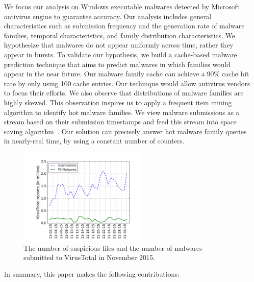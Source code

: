 We focus our analysis on Windows executable malwares detected by Microsoft
antivirus engine to guarantee accuracy. 
Our analysis includes general characteristics such as submission frequency and the generation rate of malware families, 
temporal characteristics, and family distribution characteristics. 
We hypothesize that malwares do not appear uniformly across time, rather they appear in bursts. 
To validate our hypothesis, we build a cache-based malware prediction technique that aims to predict malwares in which families would appear in the near future. 
Our malware family cache can achieve a 90\% cache hit rate by only using 100 cache entries.
Our technique would allow antivirus vendors to focus their efforts. 
We also observe that distributions of malware families are highly skewed. 
This observation inspires us to apply a frequent item mining algorithm to 
identify hot malware families. 
We view malware submissions as a stream based on their submission timestamps and 
feed this stream into space saving algorithm~\cite{space-saving}. 
Our solution can precisely answer hot malware family queries in nearly-real time, by using a constant number of counters.  


\begin{figure}[t!]
\begin{center}
\includegraphics[width=2.5in]{figure/nov}
\caption{The number of suspicious files and the number of malwares submitted to VirusTotal in November 2015. }
\label{fig:subnum}
\end{center}
\end{figure}

In summary, this paper makes the following contributions:


